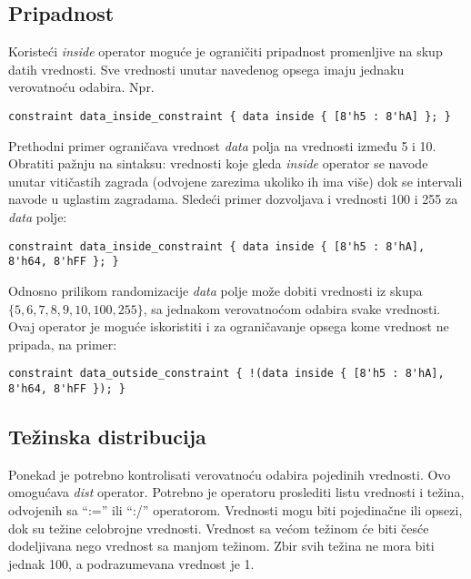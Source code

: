 
\subsection{Pripadnost}

Koristeći \emph{inside} operator moguće je ograničiti pripadnost promenljive na
skup datih vrednosti. Sve vrednosti unutar navedenog opsega imaju jednaku
verovatnoću odabira. Npr.

\begin{lstlisting}
constraint data_inside_constraint { data inside { [8'h5 : 8'hA] }; }
\end{lstlisting}

Prethodni primer ograničava vrednost \emph{data} polja na vrednosti između 5 i
10. Obratiti pažnju na sintaksu: vrednosti koje gleda \emph{inside} operator se
navode unutar vitičastih zagrada (odvojene zarezima ukoliko ih ima više) dok se
intervali navode u uglastim zagradama. Sledeći primer dozvoljava i vrednosti 100
i 255 za \emph{data} polje:

\begin{lstlisting}
constraint data_inside_constraint { data inside { [8'h5 : 8'hA], 8'h64, 8'hFF }; }
\end{lstlisting}

Odnosno prilikom randomizacije \emph{data} polje može dobiti vrednosti iz skupa
\(\{5, 6, 7, 8, 9, 10, 100, 255\}\), sa jednakom verovatnoćom odabira svake
vrednosti.\\

Ovaj operator je moguće iskoristiti i za ograničavanje opsega kome vrednost ne
pripada, na primer:

\begin{lstlisting}
constraint data_outside_constraint { !(data inside { [8'h5 : 8'hA], 8'h64, 8'hFF }); }
\end{lstlisting}


\subsection{Težinska distribucija}

Ponekad je potrebno kontrolisati verovatnoću odabira pojedinih vrednosti. Ovo
omogućava \emph{dist} operator. Potrebno je operatoru proslediti listu vrednosti
i težina, odvojenih sa ``:='' ili ``:/'' operatorom. Vrednosti mogu biti
pojedinačne ili opsezi, dok su težine celobrojne vrednosti. Vrednost sa većom
težinom će biti česće dodeljivana nego vrednost sa manjom težinom. Zbir svih
težina ne mora biti jednak 100, a podrazumevana vrednost je 1.\\

